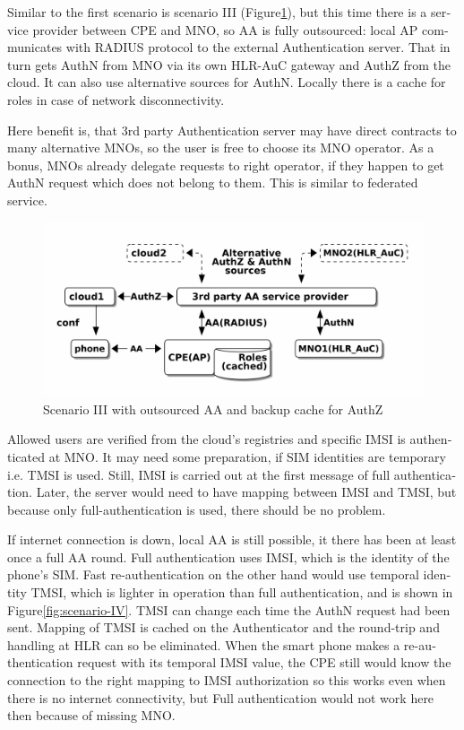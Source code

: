 \documentclass[12pt,a4paper,english]{tutthesis}
\begin{document}
\begin{otherlanguage}{english}
\label{scenario-iii}

Similar to the first scenario is scenario III (Figure\ref{fig:scenario-III}), 
but this time there is a service provider between CPE and MNO, so AA is fully outsourced:
local AP communicates with RADIUS protocol to the external
Authentication server. That in turn gets AuthN from MNO via its own
HLR-AuC gateway and AuthZ from the cloud. It can also use alternative
sources for AuthN.
Locally there is a cache for roles in case of network disconnectivity.

Here benefit is, that 3rd party Authentication server may have direct
contracts to many alternative MNOs, so the user is free to choose its
MNO operator. As a bonus,  MNOs already delegate requests to right operator, if
they happen to get AuthN request which does not belong to them.
This is similar to federated service.

\begin{figure}[htb]
\centering
\includegraphics[width=.9\linewidth]{scenIII.png}
\caption{\label{fig:scenario-III}Scenario III with outsourced AA and backup cache for AuthZ}
\end{figure}

Allowed users are verified from the cloud's registries and specific IMSI is
authenticated at MNO.  It may need some preparation, if SIM
identities are temporary i.e. TMSI is used.  Still, IMSI is carried
out at the first message
of full authentication. Later, the server would need to have mapping
between IMSI and TMSI, but because only full-authentication is used,
there should be no problem.



If internet connection is down, local AA is still possible, it there
has been at least once a full AA round.
Full authentication uses IMSI, which is the identity of the phone's
SIM.  Fast re-authentication on the other hand would 
use temporal identity TMSI, which is lighter in operation than full
authentication, and is shown in Figure\ref{fig:scenario-IV}. TMSI can
change each time the AuthN request had been sent. Mapping of TMSI is
cached on the Authenticator and the round-trip and handling at HLR can
so be eliminated.  When the smart phone makes a re-authentication
request with its temporal IMSI value, the CPE still would know the
connection to the right mapping to IMSI authorization so this works
even when there is no internet connectivity, but Full authentication
would not work here then because of missing MNO.



\end{otherlanguage}
\end{document}
